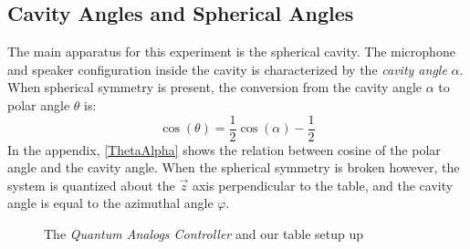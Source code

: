 \documentclass[12pt]{article}
\begin{document}
	
	\subsection{Cavity Angles and Spherical Angles}
	The main apparatus for this experiment is the spherical cavity. The microphone and speaker configuration inside the cavity is characterized by the \emph{cavity angle} $\alpha$. When spherical symmetry is present, the conversion from the cavity angle $\alpha$ to polar angle $\theta$ is:
		\begin{equation}
		\label{alpha2theta}
		\cos(\theta) = \frac{1}{2}\cos(\alpha) - \frac{1}{2}
		\end{equation}
	In the appendix, \cref{ThetaAlpha} shows the relation between cosine of the polar angle and the cavity angle. When the spherical symmetry is broken however, the system is quantized about the $\vec{z}$ axis perpendicular to the table, and the cavity angle is equal to the azimuthal angle $\varphi$.
	
	\begin{figure}[H]
		\captionsetup{justification = centering}
		\centering
		\qquad
		\caption{The \emph{Quantum Analogs Controller} \protect{} and our table setup up \protect{}}
		\label{experiment}
	\end{figure}

	
\end{document}
